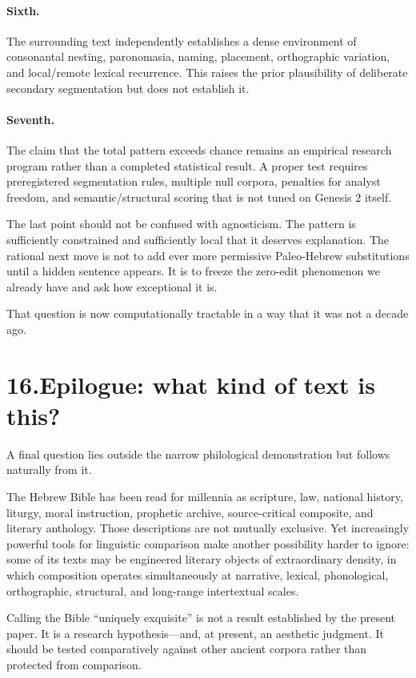 \paragraph{Sixth.}
The surrounding text independently establishes a dense environment of consonantal nesting, paronomasia, naming, placement, orthographic variation, and local/remote lexical recurrence.  This raises the prior plausibility of deliberate secondary segmentation but does not establish it.

\paragraph{Seventh.}
The claim that the total pattern exceeds chance remains an empirical research program rather than a completed statistical result.  A proper test requires preregistered segmentation rules, multiple null corpora, penalties for analyst freedom, and semantic/structural scoring that is not tuned on Genesis 2 itself.

The last point should not be confused with agnosticism.  The pattern is sufficiently constrained and sufficiently local that it deserves explanation.  The rational next move is not to add ever more permissive Paleo-Hebrew substitutions until a hidden sentence appears.  It is to freeze the zero-edit phenomenon we already have and ask how exceptional it is.

That question is now computationally tractable in a way that it was not a decade ago.

\section*{16.\quad Epilogue: what kind of text is this?}

A final question lies outside the narrow philological demonstration but follows naturally from it.

The Hebrew Bible has been read for millennia as scripture, law, national history, liturgy, moral instruction, prophetic archive, source-critical composite, and literary anthology.  Those descriptions are not mutually exclusive.  Yet increasingly powerful tools for linguistic comparison make another possibility harder to ignore: some of its texts may be engineered literary objects of extraordinary density, in which composition operates simultaneously at narrative, lexical, phonological, orthographic, structural, and long-range intertextual scales.

Calling the Bible ``uniquely exquisite'' is not a result established by the present paper.  It is a research hypothesis---and, at present, an aesthetic judgment.  It should be tested comparatively against other ancient corpora rather than protected from comparison.

